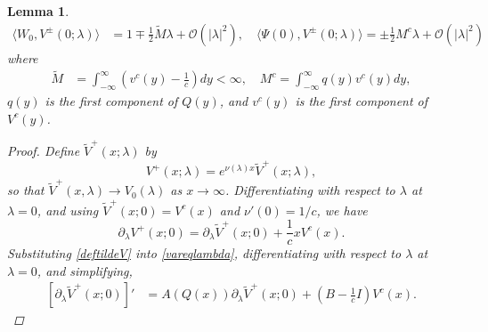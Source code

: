 \documentclass[10pt,reqno]{amsart}
\theoremstyle{plain}
\newtheorem{lemma}[theorem]{Lemma}
\theoremstyle{definition}
\theoremstyle{remark}
\numberwithin{theorem}{section}
\numberwithin{equation}{section}
\begin{document}
\begin{lemma}\label{lemma:VpmPsiIP}
\begin{equation}\label{VpmIPs}
\begin{aligned}
\langle W_0, V^\pm(0; \lambda) \rangle &= 1 \mp \frac{1}{2} \tilde{M}\lambda + \mathcal{O}(|\lambda|^2), \quad
\langle \Psi(0), V^\pm(0; \lambda) \rangle = \pm \frac{1}{2} M^c \lambda + \mathcal{O}(|\lambda|^2)
\end{aligned}
\end{equation}
where
\begin{align*}
\tilde{M} &= \int_{-\infty}^{\infty} \left(v^c(y) - \frac{1}{c}\right) dy < \infty, \quad
M^c = \int_{-\infty}^\infty q(y) v^c(y) dy,
\end{align*}
$q(y)$ is the first component of $Q(y)$, and $v^c(y)$ is the first component of $V^c(y)$.
\begin{proof}
Define $\tilde{V}^+(x; \lambda)$ by
\begin{equation}\label{deftildeV}
V^+(x; \lambda) = e^{\nu(\lambda)x}\tilde{V}^+(x; \lambda),
\end{equation}
so that $\tilde{V}^+(x, \lambda) \rightarrow V_0(\lambda)$ as $x \rightarrow \infty$. Differentiating with respect to $\lambda$ at $\lambda = 0$, and using $\tilde{V}^+(x; 0) = V^c(x)$ and $\nu'(0) = 1/c$, we have
\begin{equation}\label{VtildeVderiv}
\partial_\lambda V^+(x; 0)
= \partial_\lambda \tilde{V}^+(x; 0) + \frac{1}{c} x V^c(x).
\end{equation}
Substituting \cref{deftildeV} into \cref{vareqlambda}, differentiating with respect to $\lambda$ at $\lambda = 0$, and simplifying, 
\begin{align}\label{tildeVsolves}
[\partial_\lambda \tilde{V}^+(x; 0)]' &= A(Q(x))\partial_\lambda \tilde{V}^+(x; 0) + \left( B - \frac{1}{c}I\right) V^c(x).
\end{align}


\end{proof}
\end{lemma}
\end{document}
